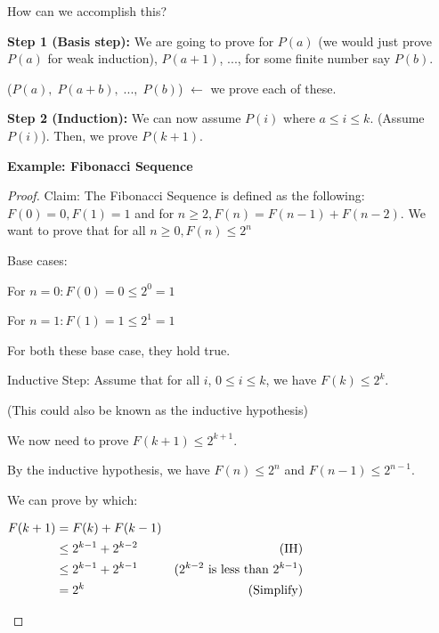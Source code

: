 \documentclass{article}
\begin{document}
How can we accomplish this?

\textbf {Step 1 (Basis step):} We are going to prove for $ P(a) $ (we would just prove $ P(a) $ for weak induction), $ P(a + 1) $, ...,
for some finite number say $ P(b) $. 

($P(a),\; P(a + b),\;...,\;P(b)$) $ \leftarrow $ we prove each of these.

\textbf {Step 2 (Induction):} We can now assume $ P(i) $ where $ a \le i \le k $. (Assume $ P(i) $).
Then, we prove $ P(k + 1) $.

\textbf {Example: Fibonacci Sequence}
\begin{proof}
Claim: 
The Fibonacci Sequence is defined as the following: $ F(0) = 0, F(1) = 1 $ and for $ n \ge 2, F(n) = F(n - 1) + F(n - 2). $
We want to prove that for all $ n \ge 0 , F(n) \le 2^n $

Base cases:

For $ n = 0: F(0) = 0 \le 2^0 = 1 $

For $ n = 1: F(1) = 1 \le 2^1 = 1 $

For both these base case, they hold true. 

Inductive Step: 
Assume that for all $ i $, $ 0 \le i \le k $, we have $ F(k) \le 2 ^ k $.

(This could also be known as the inductive hypothesis)

We now need to prove $ F(k + 1) \le 2 ^ {k + 1} $.

By the inductive hypothesis, we have $ F(n) \le 2^n $ and $ F(n - 1) \le 2^{n-1} $.

We can prove by which:
\begin{center}
  $\begin{aligned}
    F(k+1) & = F(k) + F(k-1)
    \\
    & \le 2^{k-1} + 2^{k-2} & \text{(IH)}
    \\
    & \le 2^{k-1} + 2^{k-1} & \text{($ 2^{k-2} $ is less than $ 2^{k-1} $)}
    \\
    & = 2^k & \text{(Simplify)} 
  \end{aligned}$
\end{center}
\end{proof}
\end{document}
